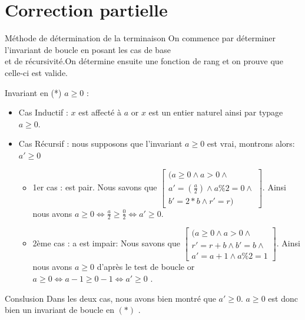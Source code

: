 \documentclass[12pt,a4paper]{report}
\begin{document}
\section{Correction partielle}
\begin{mybox}{Méthode de détermination de la terminaison}
On commence par déterminer l'invariant de boucle en posant les cas de base \\
et de récursivité.On détermine ensuite une fonction de rang et on prouve que celle-ci est valide.

\end{mybox}
\begin{flushleft}
Invariant en (*) $  a\geq 0 $  : \\
\begin{itemize}
\item Cas Inductif :  $x$ est affect\'{e} \`{a} $a$ or $x$ est un entier naturel ainsi par typage $a\ge 0$.
\item Cas Récursif : nous supposons que l’invariant  $a\ge 0$ est vrai, montrons alors: $ a' \geq 0 $ \medskip
\begin{itemize}
\item 1er cas :  est pair. Nous savons que $\left[ \begin{array}{c}(a\ge 0\wedge a>0\wedge \\
   a '=(\frac{a}{2})\wedge a\%2=0 \wedge \\
b '=2*b\wedge r '=r)\end{array}
\right]$. Ainsi nous avons $a\ge 0\Leftrightarrow \frac{a}{2}\ge \frac{0}{2}\Leftrightarrow a ' \ge 0$.\\
\item 2ème cas : a est impair: Nous savons que $\left[ \begin{array}{c}(a\ge 0\wedge a>0\wedge \\
   r '= r+b\wedge b'=b  \wedge \\
a '=a+1\wedge a\%2=1\end{array}
\right]$. Ainsi nous avons  $a\ge 0$ d’après le test de boucle or \medskip $  a\geq 0  \Leftrightarrow a-1 \ge 0-1 \Leftrightarrow a' \ge 0$ .
\bigskip
\end{itemize}
\end{itemize}
\begin{Cas1}{Conslusion}
 Dans les deux cas, nous avons bien montré que  $ a' \ge 0 $. 
 $a \geq 0$ est donc bien un invariant de boucle en $(*)$ .\\
\end{Cas1}
\end{flushleft}
\end{document}
